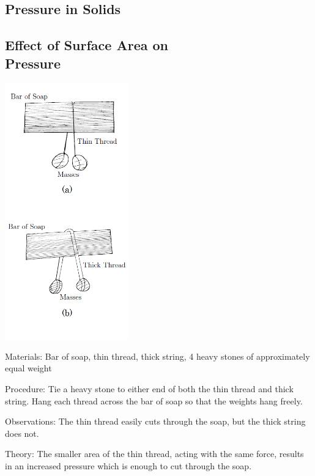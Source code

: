 \begin{multicols}{2}
\columnbreak


\section*{Pressure in Solids} 


\subsection[Effect of Surface Area on Pressure]{Effect of Surface Area on \hfill \\ Pressure}

\begin{center}
\includegraphics[width=0.4\textwidth]{./img/pressure-solids.png}
\end{center}

\begin{description*}
\item[Materials:]{Bar of soap, thin thread, thick string, 4 heavy stones of approximately equal weight}
\item[Procedure:]{Tie a heavy stone to either end of both the thin thread and thick string. Hang each thread across the bar of soap so that the weights hang freely.}
\item[Observations:]{The thin thread easily cuts through the soap, but the thick string does not.}
\item[Theory:]{The smaller area of the thin thread, acting with the same force, results in an increased pressure which is enough to cut through the soap.}
\end{description*}


\end{multicols}
